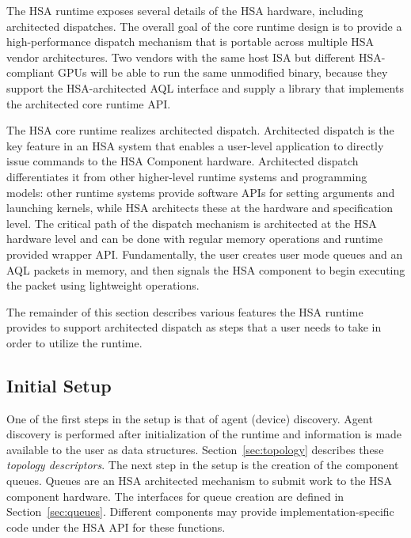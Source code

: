 \documentclass[final]{book}
\begin{document}
The HSA runtime exposes several details of the HSA hardware, including
architected dispatches. The overall goal of the core runtime design is to
provide a high-performance dispatch mechanism that is portable across multiple
HSA vendor architectures. Two vendors with the same host ISA but different
HSA-compliant GPUs will be able to run the same unmodified binary, because they
support the HSA-architected AQL interface and supply a library that implements
the architected core runtime API.

The HSA core runtime realizes architected dispatch. Architected dispatch is the
key feature in an HSA system that enables a user-level application to directly
issue commands to the HSA Component hardware. Architected dispatch
differentiates it from other higher-level runtime systems and programming
models: other runtime systems provide software APIs for setting arguments and
launching kernels, while HSA architects these at the hardware and specification
level. The critical path of the dispatch mechanism is architected at the HSA
hardware level and can be done with regular memory operations and runtime
provided wrapper API. Fundamentally, the user creates user mode queues and an
AQL packets in memory, and then signals the HSA component to begin executing the
packet using lightweight operations.

The remainder of this section describes various features the HSA runtime
provides to support architected dispatch as steps that a user needs to take in
order to utilize the runtime.

\subsection{Initial Setup}
One of the first steps in the setup is that of agent (device) discovery. Agent
discovery is performed after initialization of the runtime and information is
made available to the user as data structures. Section~\ref{sec:topology}
describes these \textit{topology descriptors}. The next step in the setup is the
creation of the component queues. Queues are an HSA architected mechanism to
submit work to the HSA component hardware. The interfaces for queue creation are
defined in Section~\ref{sec:queues}. Different components may provide
implementation-specific code under the HSA API for these functions.
\end{document}
